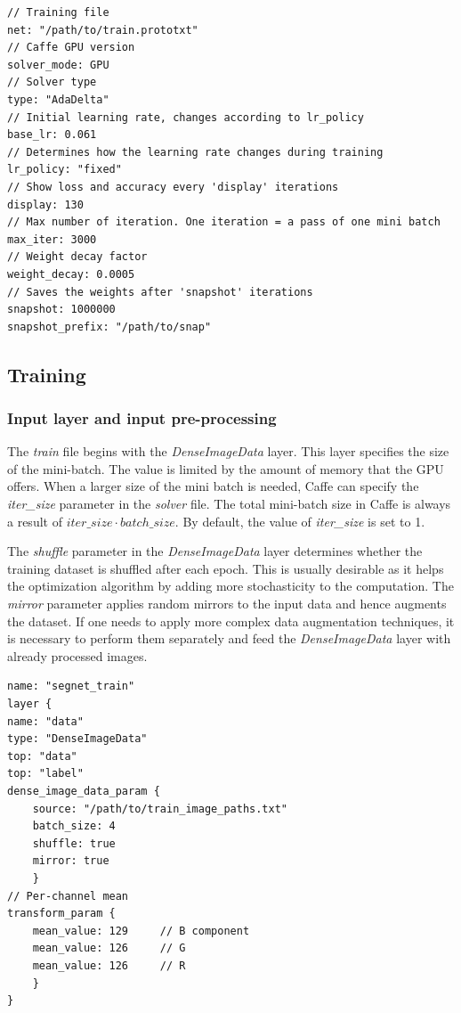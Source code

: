 \begin{lstlisting}[caption={Contents of \textit{solver.prototxt} \cite{filip_github}},captionpos=b]
// Training file
net: "/path/to/train.prototxt"	
// Caffe GPU version
solver_mode: GPU
// Solver type		
type: "AdaDelta"
// Initial learning rate, changes according to lr_policy		
base_lr: 0.061		
// Determines how the learning rate changes during training
lr_policy: "fixed"	
// Show loss and accuracy every 'display' iterations
display: 130
// Max number of iteration. One iteration = a pass of one mini batch			
max_iter: 3000	
// Weight decay factor		
weight_decay: 0.0005
// Saves the weights after 'snapshot' iterations
snapshot: 1000000		
snapshot_prefix: "/path/to/snap" 
\end{lstlisting}

\subsection{Training}

\subsubsection{Input layer and input pre-processing}

The \textit{train} file begins with the \textit{DenseImageData} layer. This layer specifies the size of the mini-batch. The value is limited by the amount of memory that the GPU offers. When a larger size of the mini batch is needed, Caffe can specify the \textit{iter\_size} parameter in the \textit{solver} file. The total mini-batch size in Caffe is always a result of $iter\_size \cdot batch\_size$. By default, the value of \textit{iter\_size} is set to 1. \cite{caffe}

The \textit{shuffle} parameter in the \textit{DenseImageData} layer determines whether the training dataset is shuffled after each epoch. This is usually desirable as it helps the optimization algorithm by adding more stochasticity to the computation. The \textit{mirror} parameter applies random mirrors to the input data and hence augments the dataset. If one needs to apply more complex data augmentation techniques, it is necessary to perform them separately and feed the \textit{DenseImageData} layer with already processed images. \cite{caffe}

\begin{lstlisting}[caption={Input layer in \textit{train.prototxt} \cite{filip_github}},captionpos=b]
name: "segnet_train"
layer {
name: "data"
type: "DenseImageData"
top: "data"
top: "label"
dense_image_data_param {
	source: "/path/to/train_image_paths.txt"
	batch_size: 4   			    			
	shuffle: true
	mirror: true	
	}
// Per-channel mean
transform_param {
	mean_value: 129		// B component
	mean_value: 126		// G
	mean_value: 126		// R
	}
}
\end{lstlisting} 

